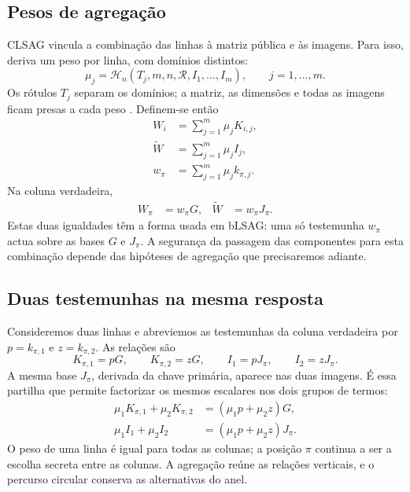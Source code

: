 \subsection*{Pesos de agregação}

CLSAG vincula a combinação das linhas à matriz pública e às imagens.
Para isso, deriva um peso por linha, com domínios distintos:
\[
\mu_j=\mathcal H_n(T_j,m,n,\mathcal R,I_1,\ldots,I_m),
\qquad j=1,\ldots,m.
\]
Os rótulos \(T_j\) separam os domínios; a matriz, as dimensões e todas as
imagens ficam presas a cada peso \cite{MRL-0011-CLSAG}. Definem-se então
\begin{align*}
W_i&=\sum_{j=1}^{m}\mu_jK_{i,j},\\
\widetilde W&=\sum_{j=1}^{m}\mu_jI_j,\\
w_\pi&=\sum_{j=1}^{m}\mu_jk_{\pi,j}.
\end{align*}
Na coluna verdadeira,
\begin{align*}
W_\pi&=w_\pi G,&
\widetilde W&=w_\pi J_\pi.
\end{align*}
Estas duas igualdades têm a forma usada em bLSAG: uma só testemunha
\(w_\pi\) actua sobre as bases \(G\) e \(J_\pi\). A segurança da
passagem das componentes para esta combinação depende das hipóteses de
agregação que precisaremos adiante.

\subsection*{Duas testemunhas na mesma resposta}

Consideremos duas linhas e abreviemos as testemunhas da coluna verdadeira
por \(p=k_{\pi,1}\) e \(z=k_{\pi,2}\). As relações são
\[
 K_{\pi,1}=pG,\qquad K_{\pi,2}=zG,
 \qquad I_1=pJ_\pi,\qquad I_2=zJ_\pi.
\]
A mesma base \(J_\pi\), derivada da chave primária, aparece nas duas
imagens. É essa partilha que permite factorizar os mesmos escalares
nos dois grupos de termos:
\begin{align*}
 \mu_1K_{\pi,1}+\mu_2K_{\pi,2}
    &=(\mu_1p+\mu_2z)G,\\
 \mu_1I_1+\mu_2I_2
    &=(\mu_1p+\mu_2z)J_\pi.
\end{align*}
O peso de uma linha é igual para todas as colunas; a posição \(\pi\)
continua a ser a escolha secreta entre as colunas. A agregação reúne
as relações verticais, e o percurso circular conserva as alternativas
do anel.

